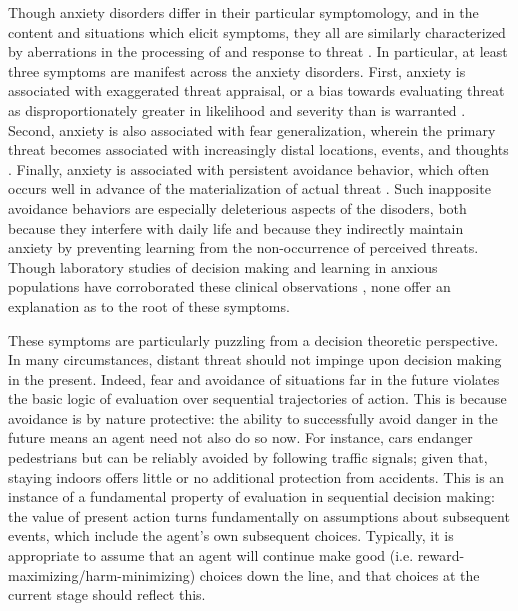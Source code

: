 \documentclass[11pt]{article} %
\begin{document}
Though anxiety disorders differ in their particular symptomology, and in the content and situations which elicit symptoms, they all are similarly characterized by aberrations in the processing of and response to threat \citep{dsm5}. In particular, at least three symptoms are manifest across the anxiety disorders. First, anxiety is associated with exaggerated threat appraisal, or a bias towards evaluating threat as disproportionately greater in likelihood and severity than is warranted \citep{ClarkBeck2011}. Second, anxiety is also associated with fear generalization, wherein the primary threat becomes associated with increasingly distal locations, events, and thoughts \citep{dymond2015}. Finally, anxiety is associated with persistent avoidance behavior, which often occurs well in advance of the materialization of actual threat \citep{Arnaudova2017}. Such inapposite avoidance behaviors are especially deleterious aspects of the disoders, both because they interfere with daily life and because they indirectly maintain anxiety by preventing learning from the non-occurrence of perceived threats. Though laboratory studies of decision making and learning in anxious populations have corroborated these clinical observations \citep{Harle2017, norbury2018, Aylward2019}, none offer an explanation as to the root of these symptoms.

These symptoms are particularly puzzling from a decision theoretic perspective\citep{huys2015}. In many circumstances, distant threat should not impinge upon decision making in the present. Indeed, fear and avoidance of situations far in the future violates the basic logic of evaluation over sequential trajectories of action. This is because avoidance is by nature protective: the ability to successfully avoid danger in the future means an agent need not also do so now. For instance, cars endanger pedestrians but can be reliably avoided by following traffic signals; given that, staying indoors offers little or no additional protection from accidents. This is an instance of a fundamental property of evaluation in sequential decision making: the value of present action turns fundamentally on assumptions about subsequent events, which include the agent's own subsequent choices. Typically, it is appropriate to assume that an agent will continue make good (i.e. reward-maximizing/harm-minimizing) choices down the line, and that choices at the current stage should reflect this.
\end{document}
